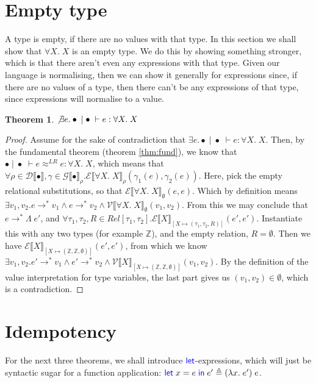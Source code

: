 \documentclass[twoside,11pt,openright]{report}
\newtheorem{theorem}{Theorem}
\theoremstyle{definition}
\newcommand{\Keyword}[1]{{\color{blue} \mathsf{#1}}}
\newcommand{\var}{x}
\newcommand{\expr}{e}
\newcommand{\val}{v}
\newcommand{\LetCmd}{\Keyword{let}}
\newcommand{\Tvar}{X}
\newcommand{\Tlam}{\Lambda\;}
\newcommand{\Tint}{\mathbb{Z}}
\newcommand{\Tall}[2]{\forall #1.\; #2}
\newcommand{\typ}{\tau}
\newcommand{\emptenv}{\bullet}
\newcommand{\empvenv}{\bullet}
\newcommand{\jdg}[4]{#1 \; | \; #2 \; \vdash #3 : #4}
\newcommand{\jdgRel}[6]{#1 \; | \; #2 \; \vdash #3 \approx^{#4} #5 : #6}
\newcommand{\stepS}{\rightarrow^*}
\newcommand{\ValInp}[2]{\mathcal{V} \llbracket #1 \rrbracket_{#2}}
\newcommand{\ValInpGen}[2]{\ValInp{#1}{#2}(\val_1, \val_2)}
\newcommand{\ExpInp}[2]{\mathcal{E} \llbracket #1 \rrbracket_{#2}}
\newcommand{\VenvInp}[2]{\mathcal{G} \llbracket #1 \rrbracket_{#2}}
\newcommand{\TenvInp}[1]{\mathcal{D} \llbracket #1 \rrbracket}
\newcommand{\LogRel}[5]{\jdgRel{#1}{#2}{#3}{LR}{#4}{#5}}
\newcommand{\map}[2]{#1 \mapsto #2}
\begin{document}
\section{Empty type}
A type is empty, if there are no values with that type. In this section we shall show that $\Tall{\Tvar}{\Tvar}$ is an empty type. We do this by showing something stronger, which is that there aren't even any expressions with that type. Given our language is normalising, then we can show it generally for expressions since, if there are no values of a type, then there can't be any expressions of that type, since expressions will normalise to a value.
\begin{theorem}
  $\not\exists \expr . \jdg{\emptenv}{\empvenv}{\expr}{\Tall{\Tvar}{\Tvar}}$
\end{theorem}
\begin{proof}
  Assume for the sake of contradiction that $\exists \expr . \jdg{\emptenv}{\empvenv}{\expr}{\Tall{\Tvar}{\Tvar}}$. Then, by the fundamental theorem (theorem \ref{thm:fund}), we know that $\LogRel{\emptenv}{\empvenv}{\expr}{\expr}{\Tall{\Tvar}{\Tvar}}$, which means that $\forall \rho \in \TenvInp{\emptenv}, \gamma \in \VenvInp{\empvenv}{\rho} . 
  \ExpInp{\Tall{\Tvar}{\Tvar}}{\rho}(\gamma_1(\expr), \gamma_2(\expr))$. Here, pick the empty relational substitutions, so that $\ExpInp{\Tall{\Tvar}{\Tvar}}{\emptyset}(\expr, \expr)$. Which by definition means $\exists \val_1, \val_2 . \expr \stepS \val_1 \land \expr \stepS \val_2 \land \ValInpGen{\Tall{\Tvar}{\Tvar}}{\emptyset}$. From this we may conclude that $\expr \stepS \Tlam \expr'$, and $\forall \typ_1, \typ_2, R \in Rel[\typ_1, \typ_2] . \ExpInp{\Tvar}{[\map{\Tvar}{(\typ_1, \typ_2, R)}]}(\expr', \expr')$. Instantiate this with any two types (for example $\Tint$), and the empty relation, $R = \emptyset$. Then we have $\ExpInp{\Tvar}{[\map{\Tvar}{(\Tint, \Tint, \emptyset)}]}(\expr', \expr')$, from which we know $\exists \val_1, \val_2 . \expr' \stepS \val_1 \land \expr' \stepS \val_2 \land \ValInpGen{\Tvar}{[\map{\Tvar}{(\Tint, \Tint, \emptyset)}]}$. By the definition of the value interpretation for type variables, the last part gives us $(\val_1, \val_2) \in \emptyset$, which is a contradiction.
\end{proof}

\section{Idempotency}
For the next three theorems, we shall introduce $\LetCmd$-expressions, which will just be syntactic sugar for a function application: $\Let \var = \expr in \expr' \triangleq (\fun \var . \expr') \; \expr$.
\end{document}
